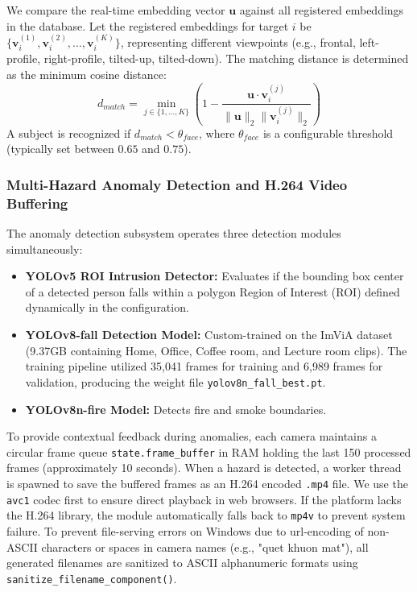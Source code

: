 \documentclass[12pt,a4paper]{article}
\begin{document}
We compare the real-time embedding vector $\mathbf{u}$ against all registered embeddings in the database. Let the registered embeddings for target $i$ be $\{\mathbf{v}_i^{(1)}, \mathbf{v}_i^{(2)}, \dots, \mathbf{v}_i^{(K)}\}$, representing different viewpoints (e.g., frontal, left-profile, right-profile, tilted-up, tilted-down). The matching distance is determined as the minimum cosine distance:
\begin{equation}
    d_{match} = \min_{j \in \{1,\dots,K\}} \left( 1 - \frac{\mathbf{u} \cdot \mathbf{v}_i^{(j)}}{\|\mathbf{u}\|_2 \|\mathbf{v}_i^{(j)}\|_2} \right)
\end{equation}
A subject is recognized if $d_{match} < \theta_{face}$, where $\theta_{face}$ is a configurable threshold (typically set between $0.65$ and $0.75$).

\subsubsection*{Multi-Hazard Anomaly Detection and H.264 Video Buffering}
The anomaly detection subsystem operates three detection modules simultaneously:
\begin{itemize}
    \item \textbf{YOLOv5 ROI Intrusion Detector:} Evaluates if the bounding box center of a detected person falls within a polygon Region of Interest (ROI) defined dynamically in the configuration.
    \item \textbf{YOLOv8-fall Detection Model:} Custom-trained on the ImViA dataset (9.37GB containing Home, Office, Coffee room, and Lecture room clips). The training pipeline utilized 35,041 frames for training and 6,989 frames for validation, producing the weight file \texttt{yolov8n\_fall\_best.pt}.
    \item \textbf{YOLOv8n-fire Model:} Detects fire and smoke boundaries.
\end{itemize}

To provide contextual feedback during anomalies, each camera maintains a circular frame queue \texttt{state.frame\_buffer} in RAM holding the last 150 processed frames (approximately 10 seconds). When a hazard is detected, a worker thread is spawned to save the buffered frames as an H.264 encoded \texttt{.mp4} file.
We use the \texttt{avc1} codec first to ensure direct playback in web browsers. If the platform lacks the H.264 library, the module automatically falls back to \texttt{mp4v} to prevent system failure.
To prevent file-serving errors on Windows due to url-encoding of non-ASCII characters or spaces in camera names (e.g., "quet khuon mat"), all generated filenames are sanitized to ASCII alphanumeric formats using \texttt{sanitize\_filename\_component()}.
\end{document}
